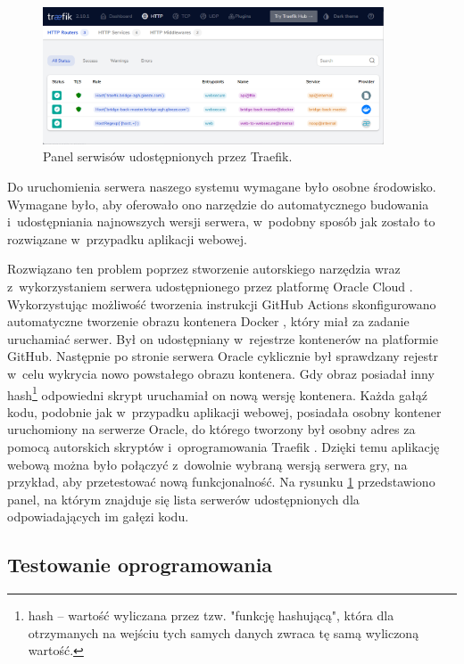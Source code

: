 \begin{figure}[!]
    \centering
    \includegraphics[width=0.9\textwidth]{img/traefik/dashboard.png}
    \caption{Panel serwisów udostępnionych przez Traefik.}
    \label{fig:traefik-dashboard}
\end{figure}

Do uruchomienia serwera naszego systemu wymagane było
osobne środowisko. Wymagane było, aby oferowało ono
narzędzie do automatycznego budowania i~udostępniania
najnowszych wersji serwera, w~podobny sposób jak zostało
to rozwiązane w~przypadku aplikacji webowej.

Rozwiązano ten problem poprzez stworzenie autorskiego
narzędzia wraz z~wykorzystaniem serwera udostępnionego
przez platformę Oracle Cloud \cite{OracleCloud}.
Wykorzystując możliwość tworzenia instrukcji GitHub Actions
skonfigurowano automatyczne tworzenie obrazu kontenera
Docker \cite{Docker}, który miał za zadanie uruchamiać
serwer. Był on udostępniany w~rejestrze kontenerów na
platformie GitHub. Następnie po stronie serwera Oracle
cyklicznie był sprawdzany rejestr w~celu wykrycia
nowo powstałego obrazu kontenera. Gdy obraz posiadał
inny hash\footnote{hash -- wartość wyliczana przez tzw. "funkcję
    hashującą", która dla otrzymanych na wejściu tych
    samych danych zwraca tę samą wyliczoną wartość.}
odpowiedni skrypt uruchamiał on nową wersję kontenera.
Każda gałąź kodu, podobnie jak w~przypadku aplikacji
webowej, posiadała osobny kontener uruchomiony na serwerze
Oracle, do którego tworzony był osobny adres za pomocą
autorskich skryptów i~oprogramowania Traefik \cite{Traefik}.
Dzięki temu aplikację webową można było połączyć
z~dowolnie wybraną wersją serwera gry, na przykład, aby
przetestować nową funkcjonalność. Na rysunku
\ref{fig:traefik-dashboard} przedstawiono panel, na którym
znajduje się lista serwerów udostępnionych dla
odpowiadających im gałęzi kodu.

\FloatBarrier


\subsection{Testowanie oprogramowania}


